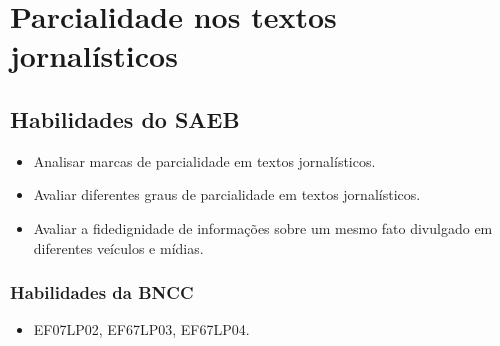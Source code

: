\chapter{Parcialidade nos textos jornalísticos}

\vspace*{-.5cm}
\enlargethispage{4\baselineskip}

\section*{Habilidades do SAEB}

\begin{itemize}

  \item Analisar marcas de parcialidade em textos jornalísticos.

  \item Avaliar diferentes graus de parcialidade em textos jornalísticos.

  \item Avaliar a fidedignidade de informações sobre um mesmo fato divulgado 
  em diferentes veículos e mídias.

\end{itemize}

\subsection{Habilidades da BNCC}

\begin{itemize}

  \item EF07LP02, EF67LP03, EF67LP04.

\end{itemize}

